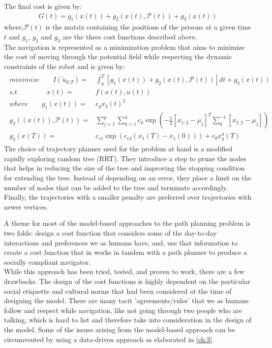 
The final cost is given by: 
\begin{align}
G(t) = g_{1}(x(t)) + g_{2}(x(t), \mathcal{P}(t)) + g_{3}(x(t))
\end{align}
where,$\mathcal{P}(t)$ is the matrix containing the positions of the persons at a given time $t$ and $g_{1}$, $g_{2}$ and $g_{3}$ are the three cost functions described above.\\
The navigation is represented as a minimization problem that aims to minimize the cost of moving through the potential field while respecting the dynamic constraints of the robot and is given by:
\begin{align}
\begin{split}
minimize \qquad I(\tilde{u}_{0:T}) = &\int_{0}^{T} [g_{1}(x(t)) + g_{2}(x(t), \mathcal{P}(t))]dt + g_{3}(x(t))\\
s.t. \qquad \qquad \dot{x}(t) = & f(x(t),u(t)) \\
where \qquad g_{1}(x(t)) = &c_{y}x_{2}(t)^{2}\\
g_{2}((x(t)), \mathcal{P}(t)) = &\sum_{j=1}^{p} \sum_{k=1}^{4} c_{k}\exp(-\frac{1}{2}[x_{1:2} - \mu_{j}]^{T}\sum^{-1}_{k}[x_{1:2} - \mu_{j}])\\
g_{3}(x(T)) = & c_{e1}\exp(c_{e2}(x_{1}(T) - x_{1}(0))) + c_{\theta}x_{4}^{4}(T)
\end{split}
\end{align}
The choice of trajectory planner used for the problem at hand is a modified rapidly exploring random tree (RRT). They introduce a step to prune the nodes that helps in reducing the size of the tree and improving the stopping condition for extending the tree. Instead of depending on an error, they place a limit on the number of nodes that can be added to the tree and terminate accordingly. Finally, the trajectories with a smaller penalty are preferred over trajectories with newer vertices.
\vspace{3cm}
\par
A theme for most of the model-based approaches to the path planning problem is two folds: design a cost function that considers some of the day-to-day interactions and preferences we as humans have, and, use that information to create a cost function that in works in tandem with a path planner to produce a socially compliant navigator.\\
While this approach has been tried, tested, and proven to work, there are a few drawbacks. The design of the cost functions is highly dependent on the particular social etiquette and cultural norms that had been considered at the time of designing the model. There are many tacit 'agreements/rules' that we as humans follow and respect while navigation, like not going through two people who are talking, which is hard to list and therefore take into consideration in the design of the model. Some of the issues arising from the model-based approach can be circumvented by using a data-driven approach as elaborated in \autoref{ch:3}.












